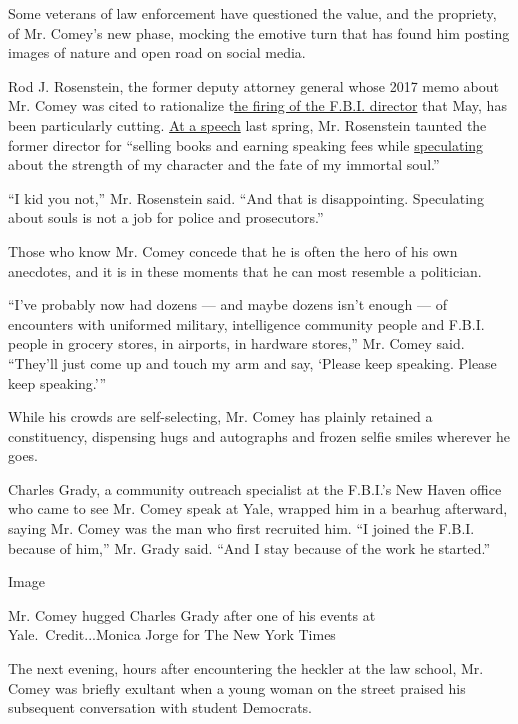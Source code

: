 Some veterans of law enforcement have questioned the value, and the
propriety, of Mr. Comey's new phase, mocking the emotive turn that has
found him posting images of nature and open road on social media.

Rod J. Rosenstein, the former deputy attorney general whose 2017 memo
about Mr. Comey was cited to rationalize
t\href{https://www.nytimes.com/2017/05/09/us/politics/james-comey-fired-fbi.html}{he
firing of the F.B.I. director} that May, has been particularly cutting.
\href{https://www.wsj.com/articles/rod-rosenstein-slams-former-fbi-director-james-comey-in-speech-11557792860}{At
a speech} last spring, Mr. Rosenstein taunted the former director for
``selling books and earning speaking fees while
\href{https://www.nytimes.com/2019/05/01/opinion/william-barr-testimony.html}{speculating}
about the strength of my character and the fate of my immortal soul.''

``I kid you not,'' Mr. Rosenstein said. ``And that is disappointing.
Speculating about souls is not a job for police and prosecutors.''

Those who know Mr. Comey concede that he is often the hero of his own
anecdotes, and it is in these moments that he can most resemble a
politician.

``I've probably now had dozens --- and maybe dozens isn't enough --- of
encounters with uniformed military, intelligence community people and
F.B.I. people in grocery stores, in airports, in hardware stores,'' Mr.
Comey said. ``They'll just come up and touch my arm and say, `Please
keep speaking. Please keep speaking.'''

While his crowds are self-selecting, Mr. Comey has plainly retained a
constituency, dispensing hugs and autographs and frozen selfie smiles
wherever he goes.

Charles Grady, a community outreach specialist at the F.B.I.'s New Haven
office who came to see Mr. Comey speak at Yale, wrapped him in a bearhug
afterward, saying Mr. Comey was the man who first recruited him. ``I
joined the F.B.I. because of him,'' Mr. Grady said. ``And I stay because
of the work he started.''

Image

Mr. Comey hugged Charles Grady after one of his events at
Yale.~Credit...Monica Jorge for The New York Times

The next evening, hours after encountering the heckler at the law
school, Mr. Comey was briefly exultant when a young woman on the street
praised his subsequent conversation with student Democrats.

